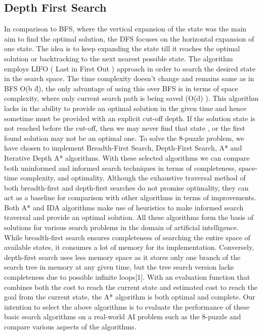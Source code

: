 \documentclass{svproc}
\begin{document}
\subsection{Depth First Search}
In comparison to BFS, where the vertical expansion of the state was the main aim to find the optimal solution, the DFS focuses on the horizontal expansion of one state.  The idea is to keep expanding the state till it reaches the optimal solution or backtracking to the next nearest possible state. The algorithm employs LIFO ( Last in First Out ) approach in order to search the desired state in the search space. The time complexity doesn’t change and remains same as in BFS O(b \^d), the only advantage of using this over BFS is in terms of space complexity, where only current search path is being saved (O(d) ).  This algorithm lacks in the ability to provide an optimal solution in the given time and hence sometime must be provided with an explicit cut-off depth. If the solution state is not reached before the cut-off, then we may never find that state , or the first found solution may not be an optimal one. 
To solve the 8-puzzle problem, we have chosen to implement Breadth-First Search, Depth-First Search, A* and Iterative Depth A* algorithms. With these selected algorithms we can compare both uninformed and informed search techniques in terms of completeness, space-time complexity, and optimality. Although the exhaustive traversal method of both breadth-first and depth-first searches do not promise optimality, they can act as a baseline for comparison with other algorithms in terms of improvements. Both A* and IDA algorithms make use of heuristics to make informed search traversal and provide an optimal solution. All these algorithms form the basis of solutions for various search problems in the domain of artificial intelligence.
While breadth-first search ensures completeness of searching the entire space of available states, it consumes a lot of memory for its implementation. Conversely, depth-first search uses less memory space as it stores only one branch of the search tree in memory at any given time, but the tree search version lacks completeness due to possible infinite loops[1]. With an evaluation function that combines both the cost to reach the current state and estimated cost to reach the goal from the current state, the A* algorithm is both optimal and complete. Our intention to select the above algorithms is to evaluate the performance of these basic search algorithms on a real-world AI problem such as the 8-puzzle and compare various aspects of the algorithms.
\end{document}
